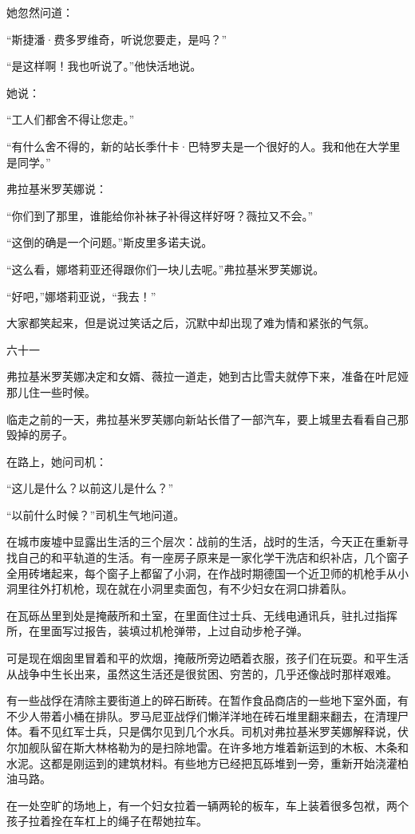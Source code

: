 她忽然问道：

“斯捷潘·费多罗维奇，听说您要走，是吗？”

“是这样啊！我也听说了。”他快活地说。

她说：

“工人们都舍不得让您走。”

“有什么舍不得的，新的站长季什卡·巴特罗夫是一个很好的人。我和他在大学里是同学。”

弗拉基米罗芙娜说：

“你们到了那里，谁能给你补袜子补得这样好呀？薇拉又不会。”

“这倒的确是一个问题。”斯皮里多诺夫说。

“这么看，娜塔莉亚还得跟你们一块儿去呢。”弗拉基米罗芙娜说。

“好吧，”娜塔莉亚说，“我去！”

大家都笑起来，但是说过笑话之后，沉默中却出现了难为情和紧张的气氛。

六十一

弗拉基米罗芙娜决定和女婿、薇拉一道走，她到古比雪夫就停下来，准备在叶尼娅那儿住一些时候。

临走之前的一天，弗拉基米罗芙娜向新站长借了一部汽车，要上城里去看看自己那毁掉的房子。

在路上，她问司机：

“这儿是什么？以前这儿是什么？”

“以前什么时候？”司机生气地问道。

在城市废墟中显露出生活的三个层次：战前的生活，战时的生活，今天正在重新寻找自己的和平轨道的生活。有一座房子原来是一家化学干洗店和织补店，几个窗子全用砖堵起来，每个窗子上都留了小洞，在作战时期德国一个近卫师的机枪手从小洞里往外打机枪，现在就在小洞里卖面包，有不少妇女在洞口排着队。

在瓦砾丛里到处是掩蔽所和土室，在里面住过士兵、无线电通讯兵，驻扎过指挥所，在里面写过报告，装填过机枪弹带，上过自动步枪子弹。

可是现在烟囱里冒着和平的炊烟，掩蔽所旁边晒着衣服，孩子们在玩耍。和平生活从战争中生长出来，虽然这生活还是很贫困、穷苦的，几乎还像战时那样艰难。

有一些战俘在清除主要街道上的碎石断砖。在暂作食品商店的一些地下室外面，有不少人带着小桶在排队。罗马尼亚战俘们懒洋洋地在砖石堆里翻来翻去，在清理尸体。看不见红军士兵，只是偶尔见到几个水兵。司机对弗拉基米罗芙娜解释说，伏尔加舰队留在斯大林格勒为的是扫除地雷。在许多地方堆着新运到的木板、木条和水泥。这都是刚运到的建筑材料。有些地方已经把瓦砾堆到一旁，重新开始浇灌柏油马路。

在一处空旷的场地上，有一个妇女拉着一辆两轮的板车，车上装着很多包袱，两个孩子拉着拴在车杠上的绳子在帮她拉车。

